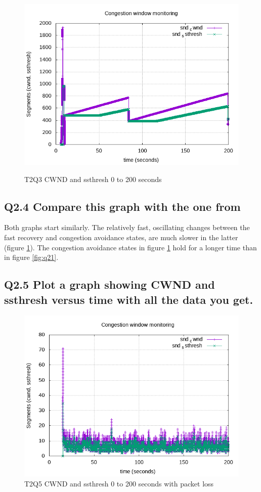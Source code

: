 \documentclass{article}
\begin{document}
\begin{figure}[H]
	\includegraphics{lab1-group1-task2-question3.png}
	\label{fig:q23}
	\caption{T2Q3 CWND and ssthresh 0 to 200 seconds}
\end{figure}


\subsection{Q2.4 Compare this graph with the one from}

Both graphs start similarly. The relatively fast, oscillating changes between
the fast recovery and congestion avoidance states, are much slower in the
latter (figure \ref{fig:q23}). The congestion avoidance states in figure \ref{fig:q23} hold for a longer time than in figure \ref{fig:q21}. 


\subsection{Q2.5 Plot a graph showing CWND and ssthresh versus time with all the data you get.}

\begin{figure}[H]
	\includegraphics{lab1-group1-task2-question5.png}
	\caption{T2Q5 CWND and ssthresh 0 to 200 seconds with packet loss}
	\label{fig:q25}
\end{figure}
\end{document}
